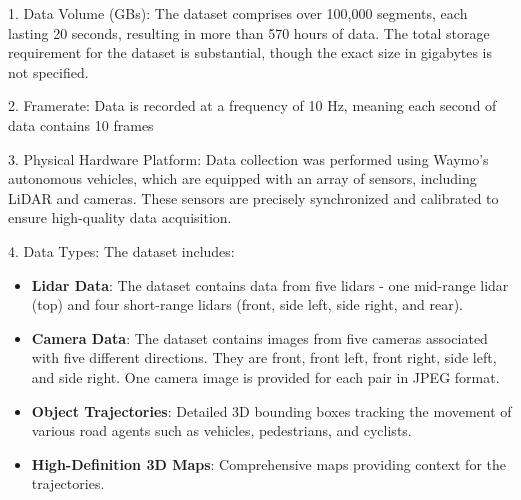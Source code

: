 \documentclass{article} %
\begin{document}
	1. Data Volume (GBs):
	The dataset comprises over 100,000 segments, each lasting 20 seconds, resulting in more than 570 hours of data. The total storage requirement for the dataset is substantial, though the exact size in gigabytes is not specified.
	
	2. Framerate:
	Data is recorded at a frequency of 10 Hz, meaning each second of data contains 10 frames
	
	3. Physical Hardware Platform: 
	Data collection was performed using Waymo’s autonomous vehicles, which are equipped with an array of sensors, including LiDAR and cameras. These sensors are precisely synchronized and calibrated to ensure high-quality data acquisition.
	
	4. Data Types:
	The dataset includes:
	\begin{itemize}
		\item \textbf{Lidar Data}: The dataset contains data from five lidars - one mid-range lidar (top) and four short-range lidars (front, side left, side right, and rear).
		
		\item \textbf{Camera Data}: The dataset contains images from five cameras associated with five different directions. They are front, front left, front right, side left, and side right. One camera image is provided for each pair in JPEG format.
		
		\item \textbf{Object Trajectories}: Detailed 3D bounding boxes tracking the movement of various road agents such as vehicles, pedestrians, and cyclists.
		
		\item \textbf{High-Definition 3D Maps}: Comprehensive maps providing context for the trajectories.
	\end{itemize}
	
\end{document}
